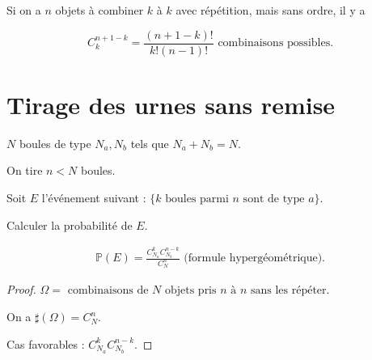 \documentclass[french]{book}
\theoremstyle{definition}
\theoremstyle{remark}
\newtheorem{exo}{Exercice}
\newcommand{\lesss}{<}
\newcommand{\less}{\lesss}
\begin{document}

Si on a $n$ objets à combiner $k$ à $k$ avec répétition, mais sans ordre, il y a

\begin{equation}
  C _{k} ^{n+1-k} = \frac{(n+1-k)!}{k!(n-1)!} \text{ combinaisons possibles.}
\end{equation}




\section{Tirage des urnes sans remise}

$N$ boules de type $N_a, N_b$ tels que $N_a + N_b = N$.

On tire $n \less N$ boules.

Soit $E$ l'événement suivant : $\{ k \text{ boules parmi } n \text{ sont de type } a \}$.

Calculer la probabilité de $E$.

\begin{gather*}
  \mathbb{P}( E ) = \frac{C _{N_a} ^{k} C _{N_b} ^{n-k}}{C_N ^{n}} \text{ (formule hypergéométrique).}
\end{gather*}

\begin{proof}
  $\Omega = \text{ combinaisons de } N \text{ objets pris } n \text{ à } n \text{ sans les répéter. }   $

  On a $\sharp(\Omega) = C_N ^{n}$.

  Cas favorables : $C _{N_a} ^{k} C _{N_b}^{n-k}$.
\end{proof}
\end{document}
